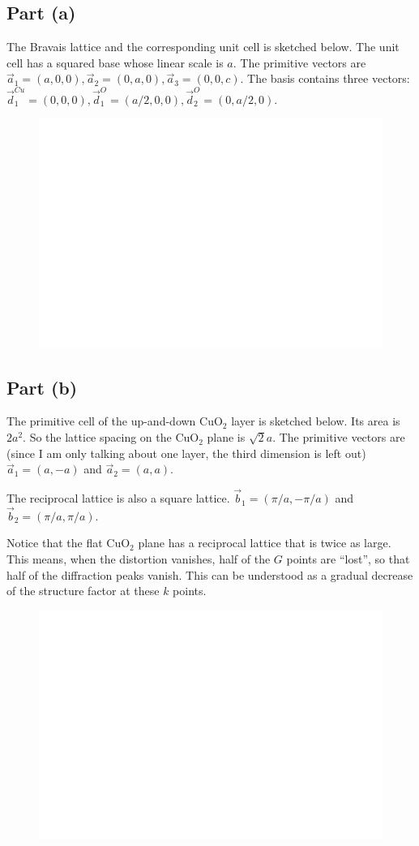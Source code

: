 \documentclass{article}
\begin{document}
\subsection{Part (a)}
The Bravais lattice and the corresponding unit cell is sketched below. The unit cell has a squared base whose linear scale is $a$. The primitive vectors are $\vec{a}_1=(a,0,0),\vec{a}_2=(0,a,0),\vec{a}_3=(0,0,c)$. The basis contains three vectors: $\vec{d}_1^{Cu}=(0,0,0),\vec{d}_1^{O}=(a/2,0,0),\vec{d}_2^{O}=(0,a/2,0)$.
\begin{figure}[!htbp]
	\centering
	\includegraphics[width=12cm]{blank.png}
\end{figure}

\subsection{Part (b)}
The primitive cell of the up-and-down CuO$_2$ layer is sketched below. Its area is $2a^2$. So the lattice spacing on the CuO$_{2}$ plane is $\sqrt{2}a$. The primitive vectors are (since I am only talking about one layer, the third dimension is left out) $\vec{a}_1=(a,-a)$ and $\vec{a}_2=(a,a)$.

The reciprocal lattice is also a square lattice. $\vec{b}_1=(\pi/a,-\pi/a)$ and $\vec{b}_2=(\pi/a,\pi/a)$.

Notice that the flat CuO$_2$ plane has a reciprocal lattice that is twice as large. This means, when the distortion vanishes, half of the $G$ points are ``lost'', so that half of the diffraction peaks vanish. This can be understood as a gradual decrease of the structure factor at these $k$ points.
\begin{figure}[!htbp]
	\centering
	\includegraphics[width=12cm]{blank.png}
\end{figure}
\end{document}
